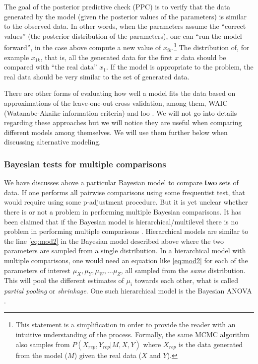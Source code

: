 \documentclass[twoside,11pt,preprint]{article}
\begin{document}
The goal of the posterior predictive check (PPC) is to verify that the
data generated by the model (given the posterior values of the
parameters) is similar to the observed data. In other words, when the
parameters assume the ``correct values'' (the posterior distribution of
the parameters), one can ``run the model forward'', in the case above
compute a new value of \(x_{ik}\).\footnote{This statement is a
simplification in order to provide the reader with an intuitive
understanding of the process. Formally, the same MCMC algorithm also
samples from $ P(X_{rep}, Y_{rep} | M, X, Y)$ where $X_{rep}$ is the
data generated from the model ($M$) given the real data ($X$ and
$Y$).} The distribution of, for example \(x_{1k}\), that is, all the
generated data for the first \(x\) data should be compared with ``the
real data'' \(x_1\). If the model is appropriate to the problem, the
real data should be very similar to the set of generated data.

There are other forms of evaluating how well a model fits the data
based on approximations of the leave-one-out cross validation, among them, WAIC
(Watanabe-Akaike information criteria) \citep{watanabe2010asymptotic} and
loo \citep{vehtari2017practical}. We will not go into details regarding
these approaches but we will notice they are useful when comparing
different models among themselves. We will use them further below
when discussing alternative modeling.

\hypertarget{bayesian-tests-for-multiple-comparisons}{%
\subsubsection{Bayesian tests for multiple comparisons}\label{bayesian-tests-for-multiple-comparisons}}

We have discusses above a particular Bayesian model to compare \textbf{two}
sets of data. If one performs all pairwise comparisons using some
frequentist test, that would require using some p-adjustment
procedure. But it is yet unclear whether there is or not a problem in
performing multiple Bayesian comparisons. It has been claimed that if
the Bayesian model is hierarchical/multilevel there is no problem in
performing multiple comparisons \citep{gelman2012we}. Hierarchical models
are similar to the line \ref{eq:mod2} in the Bayesian model described
above where the two parameters are sampled from a single distribution.
In a hierarchical model with multiple comparisons, one would need an
equation like \ref{eq:mod2} for each of the parameters of interest
\(\mu_X, \mu_Y, \mu_W, \ldots \mu_Z\), all sampled from the \emph{same}
distribution. This will pool the different estimates of \(\mu_i\)
towards each other, what is called \emph{partial pooling} or \emph{shrinkage}.
One such hierarchical model is the Bayesian ANOVA \citep[ch.~19]{kruschke2014doing}.
\end{document}
